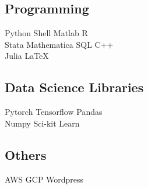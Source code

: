 \documentclass[letterpaper]{deedy-resume} %
\begin{document}
\begin{minipage}[t]{0.33\textwidth}
\subsection{Programming}

Python \textbullet{} Shell \textbullet{} Matlab \textbullet{} R \\
Stata \textbullet{} Mathematica \textbullet{} SQL \textbullet{} C++ \\ Julia \textbullet{} \LaTeX\ \\
\subsection{Data Science Libraries}
Pytorch \textbullet{} Tensorflow \textbullet{} Pandas \\ Numpy \textbullet{} Sci-kit Learn \\
\subsection{Others}
AWS \textbullet{} GCP \textbullet{} Wordpress

\sectionspace %


\end{minipage} %
\hfill
%
%
\end{document}
